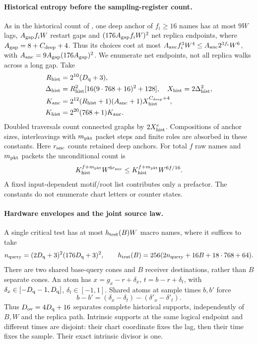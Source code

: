 \paragraph{Historical entropy before the sampling-register count.}
As in the historical count of \cite[Lemma~10.4]{DMNoise2026}, one deep
anchor of \(f_i\ge16\) names has at most \(9W\) lags,
\(A_{\rm gap}f_iW\) restart gaps and
\((176A_{\rm gap}f_iW)^2\) net replica endpoints, where
\(A_{\rm gap}=8+C_{\rm deep}+4\). Thus its choices cost at most
\(A_{\rm anc}f_i^3W^4\le A_{\rm anc}2^{3f_i}W^6\), with
\(A_{\rm anc}=9A_{\rm gap}(176A_{\rm gap})^2\).
We enumerate net endpoints, not all replica walks across a long gap.
Take
\[
\begin{split}
 R_{\rm hist}&=2^{10}(D_{\rm q}+3),\\
 \Delta_{\rm hist}&=R_{\rm hist}^2[16(9\cdot768+16)^2+128],
 \quad X_{\rm hist}=2\Delta_{\rm hist}^2,\\
 K_{\rm anc}&=2^{12}(R_{\rm hist}+1)(A_{\rm anc}+1)
 X_{\rm hist}^{C_{\rm deep}+4},\\
 K_{\rm hist}&=2^{20}(768+1)K_{\rm anc}.
\end{split}
\]
Doubled traversals count connected graphs by \(2X_{\rm hist}^e\).
Compositions of anchor sizes, interleavings with \(m_{\rm pkt}\) packet
steps and finite roles are absorbed in these constants. Here \(r_{\rm anc}\) counts retained deep anchors. For total
\(f\) raw names and \(m_{\rm pkt}\) packets the unconditional count is
\begin{equation}\label{v:history-count}
 K_{\rm hist}^{f+m_{\rm pkt}}W^{6r_{\rm anc}}
 \le K_{\rm hist}^{f+m_{\rm pkt}}W^{6f/16}.
\end{equation}
A fixed input-dependent motif/root list contributes only a prefactor.
The constants do not enumerate chart letters or counter states.

\paragraph{Hardware envelopes and the joint source law.}
A single critical test has at most \(h_{\rm test}(B)W\) macro names,
where it suffices to take
\[
 n_{\rm query}=(2D_{\rm q}+3)^2(176D_{\rm q}+3)^2,\qquad
 h_{\rm test}(B)=256(2n_{\rm query}+16B+18\cdot768+64).
\]
There are two shared base-query cones and \(B\) receiver destinations,
rather than \(B\) separate cones. An atom has
\(x=g_x-r+\delta_x\), \(t=b-r+\delta_t\), with
\(\delta_x\in[-D_{\rm q}-1,D_{\rm q}]\),
\(\delta_t\in[-1,1]\). Shared atoms at sample times \(b,b'\) force
\[
 b-b'=(\delta_x-\delta_t)-(\delta'_x-\delta'_t).
\]
Thus \(D_{\rm ov}=4D_{\rm q}+16\) separates complete historical
supports, independently of \(B,W\) and the replica path. Intrinsic
supports at the same logical endpoint and different times are disjoint:
their chart coordinate fixes the lag, then their time fixes the sample.
Their exact intrinsic divisor is one.

